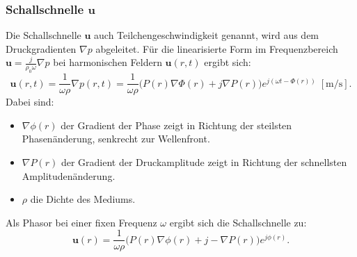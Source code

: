 \subsubsection{Schallschnelle $\boldsymbol{u}$}
 
Die Schallschnelle $\boldsymbol{u}$ auch Teilchengeschwindigkeit genannt, wird aus dem Druckgradienten $\nabla p$ abgeleitet.
Für die linearisierte Form im Frequenzbereich $\boldsymbol{u} = \frac{j}{\rho_0 \omega} \nabla p$ bei harmonischen Feldern $\boldsymbol{u}(r,t)$ ergibt sich:
\begin{equation}
\boldsymbol{u}(r,t)
=
\frac{1}{\omega \rho} \nabla p(r,t)
=
\frac{1}{\omega \rho} \bigl( P(r) \nabla \Phi(r) + j\nabla P(r) \bigr)
e^{j(\omega t -\Phi(r))}\; [\si{\metre / \second}].
\end{equation}
Dabei sind:
\begin{itemize}
\item $\nabla \phi (r)$ der Gradient der Phase zeigt in Richtung der steilsten Phasenänderung, senkrecht zur Wellenfront.
\item $\nabla P (r)$ der Gradient der Druckamplitude zeigt in Richtung der schnellsten Amplitudenänderung.
\item $\rho$ die Dichte des Mediums.
\end{itemize}
Als Phasor bei einer fixen Frequenz $\omega$ ergibt sich die Schallschnelle zu:
\begin{equation}
\boldsymbol{u}(r)
=
\frac{1}{\omega \rho}  \bigl( P(r)  \nabla \phi(r) + j - \nabla P(r) \bigr)
e^{j\phi (r)}.
\label{helmholtz:PhasorSchallschnelle}
\end{equation}
 
 
 
 
 
